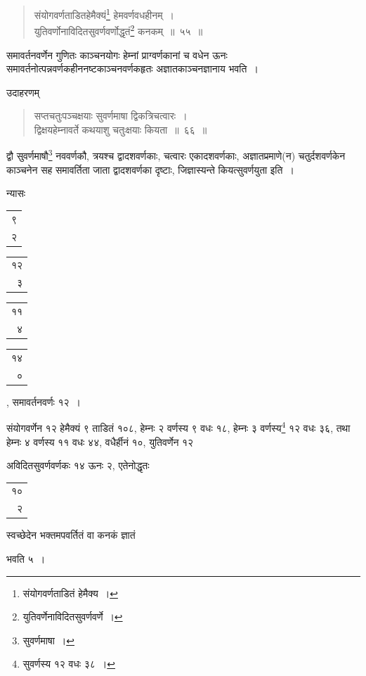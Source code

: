 \documentclass[10pt, openany]{book}
\begin{document}
{{ \label{55}
\begin{quote}
{\bs संयोगवर्णताडितहेमैक्यं\renewcommand{\thefootnote}{\s १}\footnote{\s संयोगवर्णताडितं हेमैक्य~।} हेमवर्णवधहीनम्~। \\
 युतिवर्णोनाविदितसुवर्णवर्णोद्धृतं\renewcommand{\thefootnote}{\s २}\footnote{\s युतिवर्णेनाविदितसुवर्णवर्णे~।}  कनकम्~॥~५५~॥}\end{quote}

{समावर्तनवर्णेन गुणितः काञ्चनयोगः हेम्नां प्राग्वर्णकानां च वधेन ऊनः
समावर्तनोत्पन्नवर्णकहीननष्टकाञ्चनवर्णकहृतः अज्ञातकाञ्चनज्ञानाय भवति~।}
\vspace{3mm}

{उदाहरणम्\textemdash}

\begin{quote}
    
{\eg सप्तचतुःपञ्चक्षयाः सुवर्णमाषा द्विकत्रिचत्वारः~। \\
 द्विक्षयहेम्नावर्ते कथयाशु चतुःक्षयाः कियता~॥~६६~॥} \end{quote}

{द्वौ सुवर्णमाषौ\renewcommand{\thefootnote}{\s ३}\footnote{\s सुवर्णमाषा~।}  नववर्णकौ, त्रयश्च द्वादशवर्णकाः, चत्वारः
एकादशवर्णकाः, अज्ञातप्रमाणे(न) चतुर्दशवर्णकेन काञ्चनेन सह समावर्तिता जाता द्वादशवर्णका
दृष्टाः, जिज्ञास्यन्ते}
{कियत्सुवर्णयुता इति~।}
\vspace{3mm}

{न्यासः\textendash \,\begin{tabular}{r|}९\\ २\end{tabular}\begin{tabular}{r|}१२\\ ३\end{tabular}\begin{tabular}{r|}११\\ ४\end{tabular}\begin{tabular}{r}१४\\ ०\end{tabular}, समावर्तनवर्णः १२~।}
\vspace{3mm}

{संयोगवर्णेन १२ हेमैक्यं ९ ताडितं १०८, हेम्नः २ वर्णस्य ९ वधः १८,
हेम्नः ३}
{वर्णस्य\renewcommand{\thefootnote}{\s ४}\footnote{\s सुवर्णस्य १२ वधः ३८~।}  १२ वधः ३६, तथा हेम्नः ४ वर्णस्य ११ वधः ४४, वधैर्हीनं १०,
युतिवर्णेन १२}
{अविदितसुवर्णवर्णकः १४ ऊनः २, एतेनोद्धृतः\begin{tabular}{r}१०\\ २\end{tabular}स्वच्छेदेन भक्तमपवर्तितं
वा कनकं ज्ञातं}
{भवति ५~।}
\vspace{3mm}

}}
\end{document}
